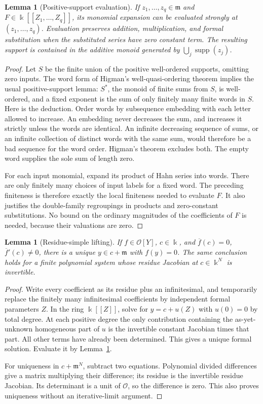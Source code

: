 \documentclass[11pt,letterpaper]{article}
\newtheorem{lemma}[theorem]{Lemma}
\theoremstyle{definition}
\theoremstyle{remark}
\newcommand{\Ocal}{\mathcal O}
\newcommand{\mfr}{\mathfrak m}
\newcommand{\supp}{\operatorname{supp}}
\begin{document}
\begin{lemma}[Positive-support evaluation]\label{prony:lem:support}
If $z_1,\ldots,z_q\in\mfr$ and
$F\in\Bbbk[[Z_1,\ldots,Z_q]]$, its monomial expansion can be evaluated
strongly at $(z_1,\ldots,z_q)$. Evaluation preserves addition, multiplication,
and formal substitution when the substituted series have zero constant
term. The resulting support is contained in the additive monoid generated
by $\bigcup_j\supp(z_j)$.
\end{lemma}
\begin{proof}
Let $S$ be the finite union of the positive well-ordered supports, omitting
zero inputs. The word form of Higman's well-quasi-ordering theorem
\cite{Higman} implies the usual positive-support lemma: $S^*$, the monoid
of finite sums from $S$, is well-ordered, and a fixed exponent is the sum
of only finitely many finite words in $S$.
Here is the deduction. Order words by subsequence embedding with each letter
allowed to increase. An embedding never decreases the sum, and increases
it strictly unless the words are identical. An infinite decreasing sequence
of sums, or an infinite collection of distinct words with the same sum,
would therefore be a bad sequence for the word order. Higman's theorem
excludes both. The empty word supplies the sole sum of length zero.

For each input monomial, expand its product of Hahn series into words.
There are only finitely many choices of input labels for a fixed word.
The preceding finiteness is therefore exactly the local finiteness needed
to evaluate $F$. It also justifies the double-family regroupings in products
and zero-constant substitutions. No bound on the ordinary magnitudes of
the coefficients of $F$ is needed, because their valuations are zero.
\end{proof}

\begin{lemma}[Residue-simple lifting]\label{prony:lem:hensel}
If $f\in\Ocal[Y]$, $c\in\Bbbk$, and
$\overline f(c)=0$, $\overline f'(c)\ne0$, there is a unique
$y\in c+\mfr$ with $f(y)=0$. The same conclusion holds for a finite
polynomial system whose residue Jacobian at $c\in\Bbbk^N$ is invertible.
\end{lemma}
\begin{proof}
Write every coefficient as its residue plus an infinitesimal, and temporarily
replace the finitely many infinitesimal coefficients by independent formal
parameters $Z$. In the ring $\Bbbk[[Z]]$, solve for $y=c+u(Z)$ with $u(0)=0$
by total degree. At each positive degree the only contribution containing
the as-yet-unknown homogeneous part of $u$ is the invertible constant
Jacobian times that part. All other terms have already been determined.
This gives a unique formal solution. Evaluate it by
Lemma~\ref{prony:lem:support}.

For uniqueness in $c+\mfr^N$, subtract two equations. Polynomial divided
differences give a matrix multiplying their difference; its residue is the
invertible residue Jacobian. Its determinant is a unit of $\Ocal$, so the
difference is zero. This also proves uniqueness without an iterative-limit
argument.
\end{proof}
\end{document}
